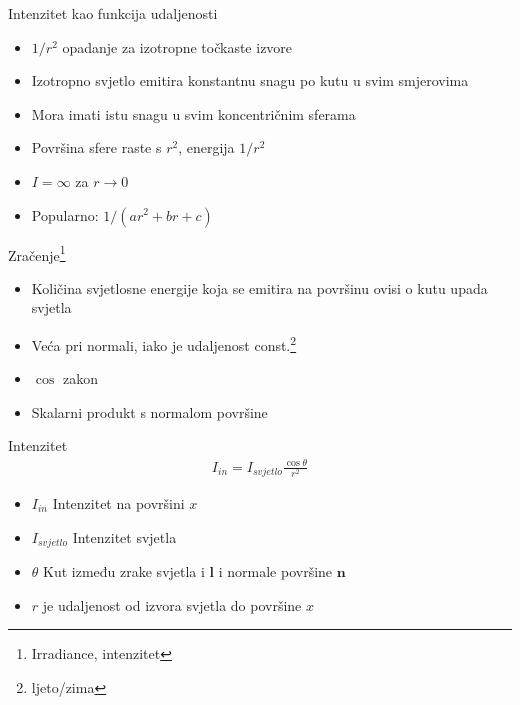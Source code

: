 \documentclass[9pt]{beamer}
\begin{document}
\begin{frame}{Intenzitet kao funkcija udaljenosti}
	\begin{itemize}
		\item $1/r^2$ opadanje za izotropne točkaste izvore
		\item Izotropno svjetlo emitira konstantnu snagu po kutu u svim smjerovima
		\item Mora imati istu snagu u svim koncentričnim sferama
		\item Površina sfere raste s $r^2$, energija $1/r^2$
		\item $I=\infty$ za $r\rightarrow 0$
		\item Popularno: $1/(ar^2 + br +c)$
	\end{itemize}
\end{frame}

\begin{frame}{Zračenje\footnote[frame]{Irradiance, intenzitet}}
	\begin{itemize}
		\item Količina svjetlosne energije koja se emitira na površinu ovisi o kutu upada svjetla
		\item Veća pri normali, iako je udaljenost const.\footnote[frame]{ljeto/zima}
		\item $\cos$ zakon
		\item Skalarni produkt s normalom površine
	\end{itemize}
\end{frame}

\begin{frame}{Intenzitet}
	\begin{align*}
	I_{in} = I_{svjetlo}\frac{\cos \theta}{r^2} 
	\end{align*}
	\begin{itemize}
		\item $I_{in}$ Intenzitet na površini $x$
		\item $I_{svjetlo}$ Intenzitet svjetla
		\item $\theta$ Kut između zrake svjetla i $\mathbf{l}$ i normale površine $\mathbf{n}$
		\item $r$ je udaljenost od izvora svjetla do površine $x$
	\end{itemize}
\end{frame}
\end{document}
